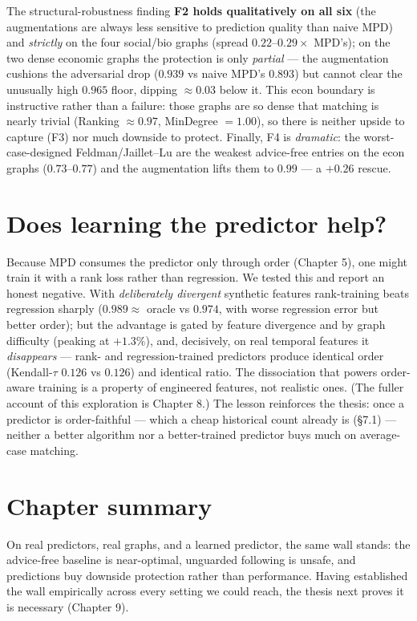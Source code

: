 The structural-robustness finding \textbf{F2 holds qualitatively on all six} (the augmentations
are always less sensitive to prediction quality than naive MPD) and \emph{strictly} on the four
social/bio graphs (spread \(0.22\)--\(0.29\times\) MPD's); on the two dense economic graphs the
protection is only \emph{partial} --- the augmentation cushions the adversarial drop (\(0.939\) vs
naive MPD's \(0.893\)) but cannot clear the unusually high \(0.965\) floor, dipping \(\approx0.03\)
below it. This econ boundary is instructive rather than a failure: those graphs are so dense
that matching is nearly trivial (Ranking \(\approx0.97\), MinDegree \(=1.00\)), so there is
neither upside to capture (F3) nor much downside to protect. Finally, F4 is \emph{dramatic}: the
worst-case-designed Feldman/Jaillet--Lu are the weakest advice-free entries on the econ graphs
(\(0.73\)--\(0.77\)) and the augmentation lifts them to \(0.99\) --- a \(+0.26\) rescue.

\section{Does learning the predictor help?}\label{does-learning-the-predictor-help}

Because MPD consumes the predictor only through order (Chapter 5), one might train it with a
rank loss rather than regression. We tested this and report an honest negative. With
\emph{deliberately divergent} synthetic features rank-training beats regression sharply (\(0.989\approx\)
oracle vs \(0.974\), with worse regression error but better order); but the advantage is gated
by feature divergence and by graph difficulty (peaking at \(+1.3\%\)), and, decisively, on real
temporal features it \emph{disappears} --- rank- and regression-trained predictors produce identical
order (Kendall-\(\tau\) \(0.126\) vs \(0.126\)) and identical ratio. The dissociation that powers
order-aware training is a property of engineered features, not realistic ones. (The fuller
account of this exploration is Chapter 8.) The lesson reinforces the thesis: once a predictor
is order-faithful --- which a cheap historical count already is (§7.1) --- neither a better
algorithm nor a better-trained predictor buys much on average-case matching.

\section{Chapter summary}\label{chapter-summary}

On real predictors, real graphs, and a learned predictor, the same wall stands: the
advice-free baseline is near-optimal, unguarded following is unsafe, and predictions buy
downside protection rather than performance. Having established the wall empirically across
every setting we could reach, the thesis next proves it is necessary (Chapter 9).

